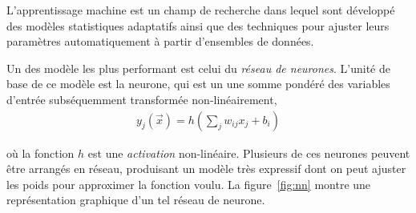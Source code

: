 L'apprentissage machine est un champ de recherche dans lequel sont
développé des modèles statistiques adaptatifs ainsi que des techniques
pour ajuster leurs paramètres automatiquement à partir
d'ensembles de données.

Un des modèle les plus performant est celui du \emph{réseau de
  neurones}. L'unité de base de ce modèle est la neurone, qui est un
une somme pondéré des variables d'entrée subséquemment transformée
non-linéairement,
\begin{eqnarray}
  y_j(\overrightarrow{x}) = h\left(\sum_jw_{ij}x_j + b_i\right)
\end{eqnarray}

\noindent où la fonction $h$ est une \emph{activation} non-linéaire. Plusieurs
de ces neurones peuvent être arrangés en réseau, produisant un modèle
très expressif dont on peut ajuster les poids pour approximer la fonction voulu.
La figure~\ref{fig:nn} montre une représentation graphique d'un tel
réseau de neurone.

